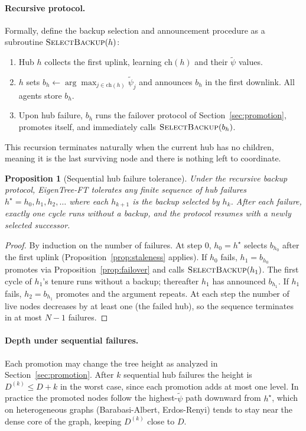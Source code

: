 \documentclass{article}
\newtheorem{proposition}{Proposition}
\newcommand{\merwft}{EigenTree-FT}
\begin{document}
\paragraph{Recursive protocol.} Formally, define the backup selection and announcement
procedure as a subroutine $\textsc{SelectBackup}(h)$:
\begin{enumerate}
    \item Hub $h$ collects the first uplink, learning $\mathrm{ch}(h)$ and their
        $\tilde\psi$ values.
    \item $h$ sets $b_h \leftarrow \arg\max_{j \in \mathrm{ch}(h)} \tilde\psi_j$ and
        announces $b_h$ in the first downlink. All agents store $b_h$.
    \item Upon hub failure, $b_h$ runs the failover protocol of
        Section~\ref{sec:promotion}, promotes itself, and immediately calls
        $\textsc{SelectBackup}(b_h)$.
\end{enumerate}
This recursion terminates naturally when the current hub has no children, meaning it is
the last surviving node and there is nothing left to coordinate.

\begin{proposition}[Sequential hub failure tolerance]
\label{prop:recursive}
    Under the recursive backup protocol, \merwft{} tolerates any finite sequence of
    hub failures $h^\star = h_0, h_1, h_2, \ldots$ where each $h_{k+1}$ is the backup
    selected by $h_k$. After each failure, exactly one cycle runs without a backup, and
    the protocol resumes with a newly selected successor.
\end{proposition}

\begin{proof}
    By induction on the number of failures. At step 0, $h_0 = h^\star$ selects $b_{h_0}$
    after the first uplink (Proposition~\ref{prop:staleness} applies). If $h_0$ fails,
    $h_1 = b_{h_0}$ promotes via Proposition~\ref{prop:failover} and calls
    $\textsc{SelectBackup}(h_1)$. The first cycle of $h_1$'s tenure runs without a
    backup; thereafter $h_1$ has announced $b_{h_1}$. If $h_1$ fails, $h_2 = b_{h_1}$
    promotes and the argument repeats. At each step the number of live nodes decreases by
    at least one (the failed hub), so the sequence terminates in at most $N-1$ failures.
\end{proof}

\paragraph{Depth under sequential failures.} Each promotion may change the tree height
as analyzed in Section~\ref{sec:promotion}. After $k$ sequential hub failures the height
is $D^{(k)} \leq D + k$ in the worst case, since each promotion adds at most one level.
In practice the promoted nodes follow the highest-$\tilde\psi$ path downward from
$h^\star$, which on heterogeneous graphs (Barabasi-Albert, Erdos-Renyi) tends to stay
near the dense core of the graph, keeping $D^{(k)}$ close to $D$.
\end{document}
